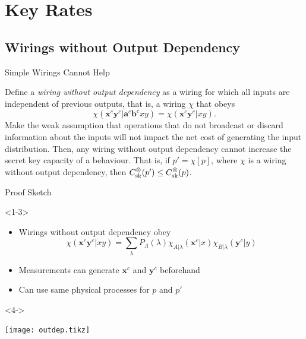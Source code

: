 \documentclass[xcolor=dvipsnames]{beamer}
\newcommand{\?}{\mathrel{?}} %
\newcommand{\cvec}[1]{\boldsymbol{\mathbf{#1}}}    %
\newcommand{\sk}{\rm sk}
\begin{document}

\section{Key Rates}

\subsection{Wirings without Output Dependency}

\begin{frame}{Simple Wirings Cannot Help}
  \begin{lemma}
    Define a \emph{wiring without output dependency} as a wiring for which all inputs are independent of previous outputs, that is, a wiring \(\chi\) that obeys
    \[
      \chi(\cvec{x}^c\cvec{y}^c|\cvec{a}^c\cvec{b}^cxy) = \chi(\cvec{x}^c\cvec{y}^c|xy).
    \]
    Make the weak assumption that operations that do not broadcast or discard information about the inputs will not impact the net cost of generating the input distribution. Then, any wiring without output dependency cannot increase the secret key capacity of a behaviour. That is, if \(p' = \chi[p]\), where \(\chi\) is a wiring without output dependency, then \(C_{\sk}^{\otimes}(p') \leq C_{\sk}^{\otimes}(p)\).
  \end{lemma}
\end{frame}

\begin{frame}{Proof Sketch}
  \begin{onlyenv}<1-3>
    \begin{itemize}[<+->]
      \item Wirings without output dependency obey
        \[ \chi(\cvec{x}^c\cvec{y}^c|xy) = \sum_{\lambda} P_{\Lambda}(\lambda) \chi_{A|\lambda}(\cvec{x}^c|x) \chi_{B|\lambda}(\cvec{y}^c|y) \]
      \item Measurements can generate \(\cvec{x}^c\) and \(\cvec{y}^c\) beforehand
      \item Can use same physical processes for \(p\) and \(p'\)
    \end{itemize}
  \end{onlyenv}
  \begin{onlyenv}<4->
    \begin{center}
      \texttt{[image: outdep.tikz]}
    \end{center}
  \end{onlyenv}
\end{frame}
\end{document}
